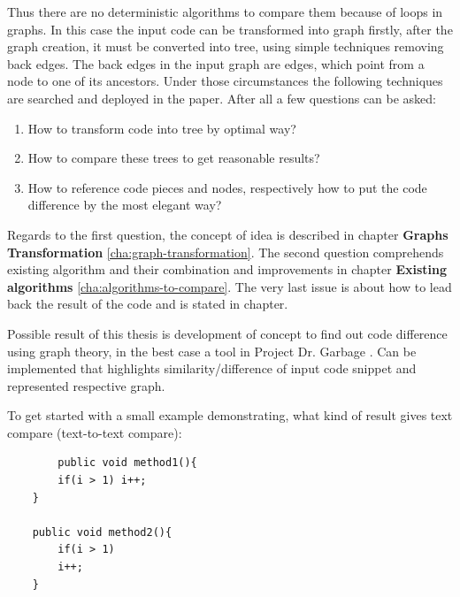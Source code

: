 \documentclass{report}
\begin{document}
Thus there are no deterministic algorithms to compare them because of loops in graphs. In this case the input code can be transformed into graph firstly, after the graph creation, it must be converted into tree, using simple techniques removing back edges. The back edges in the input graph are edges, which point from a node to one of its ancestors. Under those circumstances the following techniques are searched and deployed in the paper.
After all a few questions can be asked:
\begin{enumerate}
  \item How to transform code into tree by optimal way?
  \item How to compare these trees to get reasonable results?
  \item How to reference code pieces and nodes, respectively how to put the code difference by the most elegant way?
\end{enumerate}

Regards to the first question, the concept of idea is described in chapter \textbf{Graphs Transformation} \ref{cha:graph-transformation}. The second question comprehends existing algorithm and their combination and improvements in chapter \textbf{Existing algorithms} \ref{cha:algorithms-to-compare}. The very last issue is about how to lead back the result of the code and is stated in chapter.

Possible result of this thesis is development of concept to find out code difference using graph theory, in the best case a tool in Project Dr. Garbage \cite{drgarbage}. Can be implemented that highlights similarity/difference of input code snippet and represented respective graph.

To get started with a small example demonstrating, what kind of result gives text compare (text-to-text compare):

\begin{lstlisting}
		public void method1(){
		if(i > 1) i++;
	}
	
	public void method2(){
		if(i > 1) 
		i++;
	}

\end{lstlisting}
	
\end{document}
